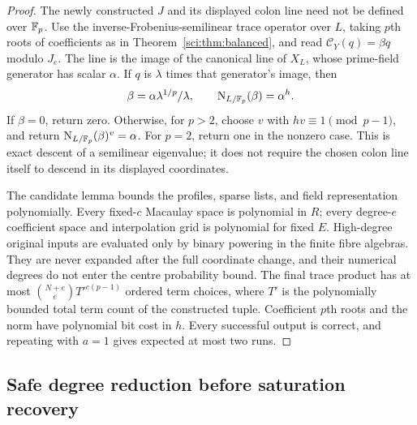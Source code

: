 \begin{proof}
The newly constructed \(J\) and its displayed colon line need not
be defined over \(\mathbb F_p\). Use the inverse-Frobenius-semilinear trace
operator over \(L\), taking \(p\)th roots of coefficients as in
Theorem~\ref{sci:thm:balanced}, and read
\(\mathcal C_Y(q)=\beta q\) modulo \(J_e\).
The line is the image of the canonical line of \(X_L\), whose
prime-field generator has scalar \(\alpha\). If \(q\) is
\(\lambda\) times that generator's image, then
\[
 \beta=\alpha\lambda^{1/p}/\lambda,
 \qquad \operatorname{N}_{L/\mathbb F_p}(\beta)=\alpha^h.
\]
If \(\beta=0\), return zero. Otherwise, for \(p>2\), choose
\(v\) with \(hv\equiv1\pmod{p-1}\), and return
\(\operatorname{N}_{L/\mathbb F_p}(\beta)^v=\alpha\).
For \(p=2\), return one in the nonzero case. This is exact descent
of a semilinear eigenvalue; it does not require the chosen colon line
itself to descend in its displayed coordinates.

The candidate lemma bounds the profiles, sparse lists, and field
representation polynomially. Every fixed-\(c\) Macaulay space is
polynomial in \(R\); every degree-\(e\) coefficient space and
interpolation grid is polynomial for fixed \(E\). High-degree original
inputs are evaluated only by binary powering in the finite fibre
algebras. They are never expanded after the full coordinate change,
and their numerical degrees do not enter the centre probability bound.
The final trace product has at most
\(\binom{N+e}{e}T'^{c(p-1)}\) ordered term choices, where \(T'\)
is the polynomially bounded total term count of the constructed tuple.
Coefficient \(p\)th roots and the norm have polynomial bit cost in
\(h\). Every successful output is correct, and repeating with \(a=1\)
gives expected at most two runs.
\end{proof}

\subsection{Safe degree reduction before saturation recovery}


